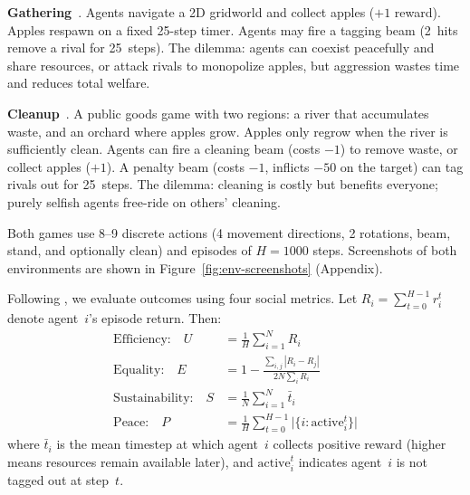 \documentclass{nextgame2026} %
\begin{document}
\textbf{Gathering}~\citep{leibo2017multi}.
Agents navigate a 2D gridworld and collect apples ($+1$ reward).  Apples
respawn on a fixed 25-step timer.  Agents may fire a tagging beam
(2~hits remove a rival for 25~steps).  The dilemma: agents can coexist
peacefully and share resources, or attack rivals to monopolize
apples, but aggression wastes time and reduces total welfare.

\textbf{Cleanup}~\citep{hughes2018inequity}.
A public goods game with two regions: a river that accumulates
waste, and an orchard where apples grow.  Apples only regrow when the
river is sufficiently clean.  Agents can fire a cleaning beam
(costs $-1$) to remove waste, or collect apples ($+1$).
A penalty beam (costs $-1$, inflicts $-50$ on the target) can tag
rivals out for 25~steps.  The dilemma: cleaning is costly but benefits
everyone; purely selfish agents free-ride on others' cleaning.

Both games use 8--9 discrete actions (4 movement directions, 2 rotations,
beam, stand, and optionally clean) and episodes of $H\!=\!1000$ steps.
Screenshots of both environments are shown in Figure~\ref{fig:env-screenshots} (Appendix).

Following \citet{perolat2017multi}, we evaluate outcomes using four social
metrics.  Let $R_i = \sum_{t=0}^{H-1} r_i^t$ denote agent~$i$'s
episode return.  Then:
\begin{align}
\text{Efficiency:}\quad U &= \frac{1}{H}\textstyle\sum_{i=1}^{N} R_i \label{eq:efficiency}\\
\text{Equality:}\quad E &= 1 - \frac{\sum_{i,j}|R_i - R_j|}{2N\sum_i R_i} \label{eq:equality}\\
\text{Sustainability:}\quad S &= \frac{1}{N}\textstyle\sum_{i=1}^{N} \bar{t}_i \label{eq:sustainability}\\
\text{Peace:}\quad P &= \frac{1}{H}\textstyle\sum_{t=0}^{H-1} \big|\{i : \mathrm{active}_i^t\}\big| \label{eq:peace}
\end{align}
where $\bar{t}_i$ is the mean timestep at which agent~$i$ collects
positive reward (higher means resources remain available later), and
$\mathrm{active}_i^t$ indicates agent~$i$ is not tagged out at step~$t$.
\end{document}
